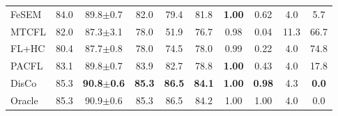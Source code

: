 \begin{tabular}{lccccccccc}
FeSEM & 84.0 & 89.8$\pm$0.7 & 82.0 & 79.4 & 81.8 & \textbf{1.00} & 0.62 & 4.0 & 5.7 \\
MTCFL & 82.0 & 87.3$\pm$3.1 & 78.0 & 51.9 & 76.7 & 0.98 & 0.04 & 11.3 & 66.7 \\
FL+HC & 80.4 & 87.7$\pm$0.8 & 78.0 & 74.5 & 78.0 & 0.99 & 0.22 & 4.0 & 74.8 \\
PACFL & 83.1 & 89.8$\pm$0.7 & 83.9 & 82.7 & 78.8 & \textbf{1.00} & 0.43 & 4.0 & 17.8 \\
DisCo & 85.3 & \textbf{90.8$\pm$0.6} & \textbf{85.3} & \textbf{86.5} & \textbf{84.1} & \textbf{1.00} & \textbf{0.98} & 4.3 & \textbf{0.0} \\
Oracle & 85.3 & 90.9$\pm$0.6 & 85.3 & 86.5 & 84.2 & 1.00 & 1.00 & 4.0 & 0.0 \\
\bottomrule
\end{tabular}
